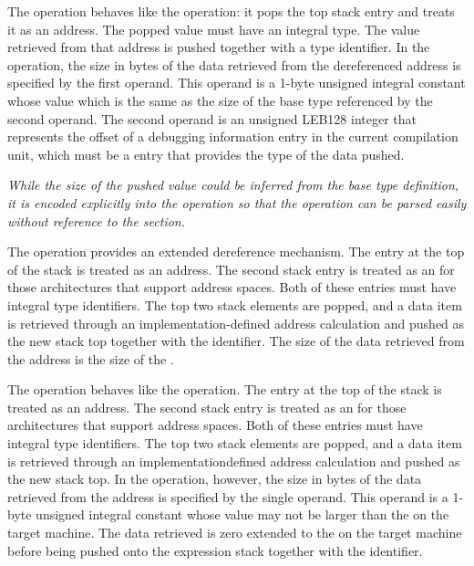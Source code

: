 \begin{enumerate}[1. ]
\itembfnl{\DWOPdereftypeTARG}
The \DWOPdereftypeNAME{} operation behaves like the \DWOPderefsize{} operation:
it pops the top stack entry and treats it as an address. 
The popped value must have an integral type.
The value retrieved from that address is pushed together with a type identifier. 
In the \DWOPdereftypeNAME{} operation, the size in
bytes of the data retrieved from the dereferenced address is specified by
the first operand. This operand is a 1-byte unsigned integral constant whose
value which is the same as the size of the base type referenced
by the second operand.
The second operand is an unsigned LEB128 integer that
represents the offset of a debugging information entry in the current
compilation unit, which must be a \DWTAGbasetype{} entry that provides the
type of the data pushed.

\textit{While the size of the pushed value could be inferred from the base 
type definition, it is encoded explicitly into the operation so that the
operation can be parsed easily without reference to the \dotdebuginfo{}
section.}

\itembfnl{\DWOPxderefTARG}
The \DWOPxderefNAME{} operation provides an extended dereference
mechanism. The entry at the top of the stack is treated as an
address. The second stack entry is treated as an  for those architectures that support
address spaces. 
Both of these entries must have integral type identifiers.
The top two stack elements are popped,
and a data item is retrieved through an implementation-defined
address calculation and pushed as the new stack top together with the
\specialaddresstype{} identifier.
The size of the data retrieved from the 
address is the size of the \specialaddresstype.

\itembfnl{\DWOPxderefsizeTARG}
The \DWOPxderefsizeNAME{} operation behaves like the
\DWOPxderef{} operation. The entry at the top of the stack is
treated as an address. The second stack entry is treated as
an  for those architectures
that support 
address spaces. 
Both of these entries must have integral type identifiers.
The top two stack
elements are popped, and a data item is retrieved through an
implementation\dash defined address calculation and pushed as the
new stack top. In the \DWOPxderefsizeNAME{} operation, however,
the size in bytes of the data retrieved from the 
address is specified by the single operand. This operand is a
1-byte unsigned integral constant whose value may not be larger
than the  on the target machine. The data
retrieved is zero extended to the  on the
target machine before being pushed onto the expression stack together
with the \specialaddresstype{} identifier.


\end{enumerate}
